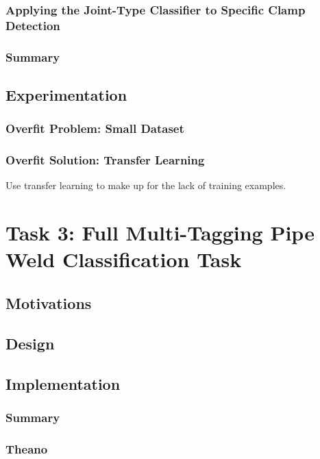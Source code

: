 \documentclass[a4paper,11pt]{article}
\begin{document}
\subsubsection{Applying the Joint-Type Classifier to Specific Clamp Detection}

\subsubsection{Summary}

\subsection{Experimentation}

\subsubsection{Overfit Problem: Small Dataset}

\subsubsection{Overfit Solution: Transfer Learning}

Use transfer learning to make up for the lack of training examples. \\


\clearpage
\section{Task 3: Full Multi-Tagging Pipe Weld Classification Task}

\subsection{Motivations}

\subsection{Design}

\subsection{Implementation}

\subsubsection{Summary}

\subsubsection{Theano}
\end{document}
